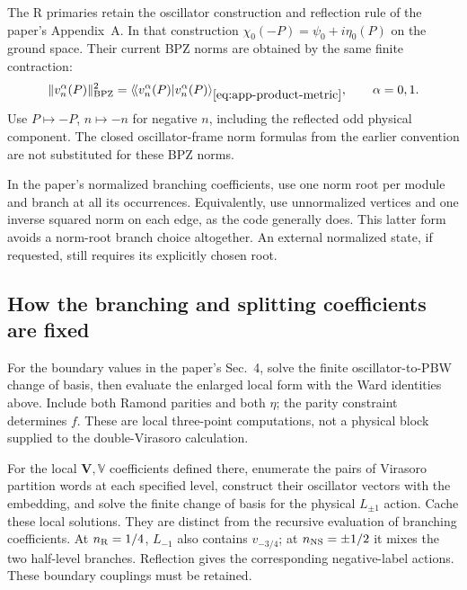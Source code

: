 The R primaries retain the oscillator construction and reflection
rule of the paper's Appendix~A. In that construction
$\chi_0(-P)=\psi_0+i\eta_0(P)$ on the ground space. Their current
BPZ norms are obtained by the same finite contraction:
\begin{equation}
 \|v_n^\alpha(P)\|_{\rm BPZ}^2
 =\langle\!\langle v_n^\alpha(P)|v_n^\alpha(P)
   \rangle_{\eqref{eq:app-product-metric}},\qquad \alpha=0,1.
 \label{eq:app-r-norms}
\end{equation}
Use $P\mapsto-P$, $n\mapsto-n$ for negative $n$,
including the reflected odd physical component. The closed
oscillator-frame norm formulas from the earlier convention are
not substituted for these BPZ norms.

In the paper's normalized branching coefficients, use one norm root
per module and branch at all its occurrences. Equivalently, use unnormalized vertices and
one inverse squared norm on each edge, as the code generally does.
This latter form avoids a norm-root branch choice altogether. An external
normalized state, if requested, still requires its explicitly chosen root.

\subsection{How the branching and splitting coefficients are fixed}
\label{app:branching-reproduction}

For the boundary values in the paper's Sec.~4, solve the finite
oscillator-to-PBW change of basis, then evaluate the enlarged local
form with the Ward identities above. Include both Ramond parities
and both $\eta$; the parity constraint determines $f$.
These are local three-point computations, not a physical block
supplied to the double-Virasoro calculation.

For the local $\mathbf V,\mathbb V$ coefficients defined there,
enumerate the pairs of Virasoro partition words at each specified
level, construct their oscillator vectors with the embedding, and
solve the finite change of basis for the physical $L_{\pm1}$ action.
Cache these local solutions. They are distinct from the recursive
evaluation of branching coefficients.
At $n_{\mathrm R}=1/4$, $L_{-1}$ also contains $v_{-3/4}$; at
$n_{\mathrm{NS}}=\pm1/2$ it mixes the two half-level branches. Reflection
gives the corresponding negative-label actions. These boundary couplings
must be retained.

